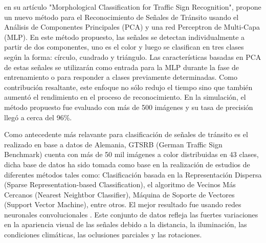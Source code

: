 		\citep{Hai2014} en su artículo "Morphological Classification for Traffic Sign Recognition", propone un nuevo método para el Reconocimiento de Señales de Tránsito usando el Análisis de Componentes Principales (PCA) y una red Perceptron de Multi-Capa (MLP). En este método propuesto, las señales se detectan individualmente a partir de dos componentes, uno es el color y luego se clasifican en tres clases según la forma: círculo, cuadrado y triángulo. Las características basadas en PCA de estas señales se utilizarán como entrada para la MLP durante la fase de entrenamiento o para responder a clases previamente determinadas. Como contribución resaltante, este enfoque no sólo redujo el tiempo sino que también aumentó el rendimiento en el proceso de reconocimiento. En la simulación, el método propuesto fue evaluado con más de 500 imágenes y su tasa de precisión llegó a cerca del 96\%. 

		\vskip 0.4cm	
		Como antecedente más relavante para clasificación de señales de tránsito es el realizado en base a datos de Alemania, GTSRB (German Traffic Sign Benchmark) cuenta con más de 50 mil imágenes a color distribuidas en 43 clases, dicha base de datos ha sido tomada como base en la realización de estudios de diferentes métodos tales como: Clasificación basada en la Representación Dispersa (Sparse Representation-based Classification), el algoritmo de Vecinos Más Cercanos (Nearest Neightbor Classifier), Máquina de Soporte de Vectores (Support Vector Machine), entre otros. El mejor resultado fue usando redes neuronales convolucionales \citep{Ciresan}.
		Este conjunto de datos refleja las fuertes variaciones en la apariencia visual de las señales debido a la distancia, la iluminación, las condiciones climáticas, las oclusiones parciales y las rotaciones. %
		\vskip 0.4cm

